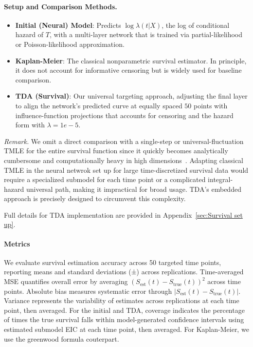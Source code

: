 \documentclass{article}
\theoremstyle{remark}
\begin{document}
\paragraph{Setup and Comparison Methods.}
\begin{itemize}[leftmargin=1.5em]
    \item \textbf{Initial (Neural) Model}: Predicts $\log\lambda(t|X)$, the log of conditional hazard of $T$, with a multi-layer network that is trained via partial-likelihood or Poisson-likelihood approximation.
    \item \textbf{Kaplan-Meier}: The classical nonparametric survival estimator. In principle, it does not account for informative censoring but is widely used for baseline comparison.
    \item \textbf{TDA (Survival)}: Our universal targeting approach, adjusting the final layer to align the network’s predicted curve at equally spaced $50$ points with influence-function projections that accounts for censoring and the hazard form with $\lambda=1e-5$. 
\end{itemize}

\emph{Remark.} We omit a direct comparison with a single-step or universal-fluctuation TMLE for the entire survival function since it quickly becomes analytically cumbersome and computationally heavy in high dimensions~\cite{rytgaard2024one,laan2003unified}. Adapting classical TMLE in the neural netwrok set up for large time-discretized survival data would require a specialized submodel for each time point or a complicated integral-hazard universal path, making it impractical for broad usage. TDA’s embedded approach is precisely designed to circumvent this complexity.

Full details for TDA implementation are provided in Appendix~\ref{sec:Survival set up}.

\paragraph{Metrics} 
We evaluate survival estimation accuracy across 50 targeted time points, reporting means and standard deviations (±) across replications. Time-averaged MSE quantifies overall error by averaging $(S_{\text{est}}(t) - S_{\text{true}}(t))^2$ across time points. Absolute bias measures systematic error through $|S_{\text{est}}(t) - S_{\text{true}}(t)|$. Variance represents the variability of estimates across replications at each time point, then averaged. For the initial and TDA, coverage indicates the percentage of times the true survival falls within model-generated confidence intervals using estimated submodel EIC at each time point, then averaged. For Kaplan-Meier, we use the greenwood formula couterpart.
\end{document}
